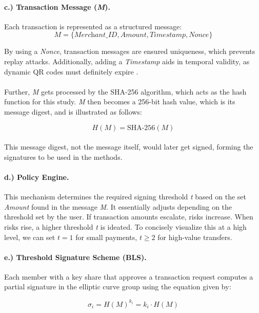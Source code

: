 \documentclass[a4paper]{scl-article}
\begin{document}
\paragraph{c.) Transaction Message (\textit{M}).}
Each transaction is represented as a structured message:
\[
\textit{M} = \{\textit{Merchant\_ID}, \textit{Amount}, \textit{Timestamp}, \textit{Nonce}\}
\]

By using a \textit{Nonce}, transaction messages are ensured uniqueness, which prevents replay attacks. Additionally, adding a \textit{Timestamp} aids in temporal validity, as dynamic QR codes must definitely expire \cite{boneh2001}.

\paragraph{}Further, \textit{M} gets processed by the SHA-256 algorithm, which acts as the hash function for this study. \textit{M} then becomes a 256-bit hash value, which is its message digest, and is illustrated as follows:

\[
H(\textit{M}) = \text{SHA-256}(\textit{M})
\]

\paragraph{}This message digest, not the message itself, would later get signed, forming the signatures to be used in the methods.

\paragraph{d.) Policy Engine.}
This mechanism determines the required signing threshold \textit{t} based on the set \textit{Amount} found in the message \textit{M}. It essentially adjusts depending on the threshold set by the user. If transaction amounts escalate, risks increase. When risks rise, a higher threshold \textit{t} is ideated. To concisely visualize this at a high level, we can set $t=1$ for small payments, $t\ge2$ for high-value transfers.

\paragraph{e.) Threshold Signature Scheme (BLS).}
Each member with a key share that approves a transaction request computes a partial signature in the elliptic curve group using the equation given by:

\[
\sigma_i = H(\textit{M})^{k_i} = k_i \cdot H(\textit{M})
\]
\end{document}
